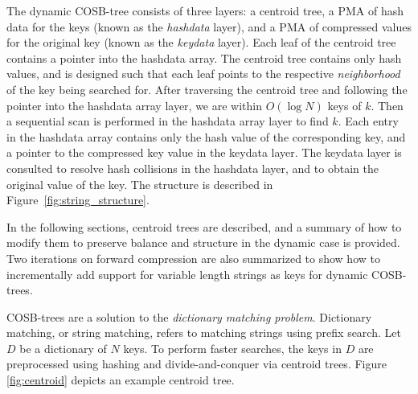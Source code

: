 \documentclass[preprint]{style}
\begin{document}
The dynamic COSB-tree consists of three layers: a centroid tree, a PMA 
of hash data for the keys (known as the 
\emph{hashdata} layer), and a PMA of compressed values for the original key
 (known as the 
\emph{keydata} layer). Each leaf of the centroid tree contains a pointer into
the hashdata array. The centroid tree contains only hash values, and is designed such that
each leaf points to the respective \emph{neighborhood} of the key being
searched for. After traversing the centroid tree and following the pointer into
the hashdata array layer, we are within $O(\log{}N)$ keys of $k$. Then a
sequential scan is performed in the hashdata array layer to find $k$. Each
entry in the hashdata array contains only the hash value of the corresponding key,
and a pointer to the compressed key value in the keydata layer. The keydata layer
is consulted to resolve hash collisions in the hashdata layer, and to obtain the original value of the key.
The structure is described in Figure~\ref{fig:string_structure}.



\vfill

In the following sections, centroid trees are described, and a summary of
how to modify them to preserve balance and structure in the dynamic case is
provided. Two iterations on forward compression are also summarized to show
how to incrementally add support for variable length strings as keys for
dynamic COSB-trees.


\vfill

COSB-trees are a solution to the \textit{dictionary matching problem}.
Dictionary matching, or string matching, refers to matching strings using
prefix search. Let $D$ be a dictionary of $N$ keys. To perform faster searches,
the keys in $D$ are preprocessed using hashing and divide-and-conquer via
centroid trees. Figure \ref{fig:centroid} depicts an example centroid tree.
\end{document}
